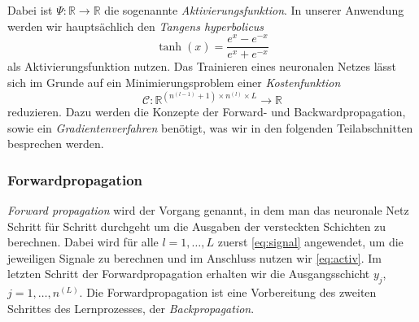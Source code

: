 Dabei ist $\Psi: \mathbb{R} \rightarrow \mathbb{R}$ die sogenannte \textit{Aktivierungsfunktion}. In unserer Anwendung
werden wir hauptsächlich den \textit{Tangens hyperbolicus}
\[
    \tanh(x)=\frac{e^x - e^{-x}}{e^x + e^{-x}}
\]
als Aktivierungsfunktion nutzen. Das Trainieren eines neuronalen Netzes lässt sich im Grunde auf ein Minimierungsproblem
einer \textit{Kostenfunktion}
\[
    \mathcal{C}: \mathbb{R}^{\left(n^{(l-1)} + 1\right) \times n^{(l)} \times L} \rightarrow \mathbb{R}
\]
reduzieren. Dazu werden die Konzepte der Forward- und Backwardpropagation, sowie ein \textit{Gradientenverfahren}
benötigt, was wir in den folgenden Teilabschnitten besprechen werden.

\subsubsection{Forwardpropagation}
{\em Forward propagation} wird der Vorgang genannt, in dem man das neuronale Netz Schritt für Schritt durchgeht um die
Ausgaben der versteckten Schichten zu berechnen. Dabei wird für alle $l = 1, \dots, L$ zuerst \eqref{eq:signal}
angewendet, um die jeweiligen Signale zu berechnen und im Anschluss nutzen wir \eqref{eq:activ}. Im letzten
Schritt der Forwardpropagation erhalten wir die Ausgangsschicht $y_{j}$, $j = 1 ,\dots, n^{(L)}$. Die Forwardpropagation ist
eine Vorbereitung des zweiten Schrittes des Lernprozesses, der \textit{Backpropagation}.

